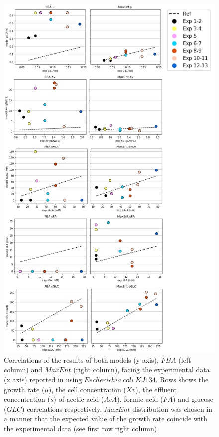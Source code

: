 \documentclass[]{article}
\begin{document}
	\begin{figure}
		\centering
		\includegraphics[scale = 0.7]{corr_s_EColi}
		\caption{Correlations of the results of both models (y axis), $FBA$ (left column) and $MaxEnt$ (right column), facing the experimental data (x axis) reported in \protect{} using $Escherichia\ coli\ KJ134$. Rows shows the growth rate ($\mu$), the cell concentration ($Xv$), the effluent concentration ($s$) of acetic acid ($AcA$), formic acid ($FA$) and glucose ($GLC$) correlations respectively. $MaxEnt$ distribution was chosen in a manner that the expected value of the growth rate coincide with the experimental data (see first row right column)}
	\end{figure}
	
\end{document}
